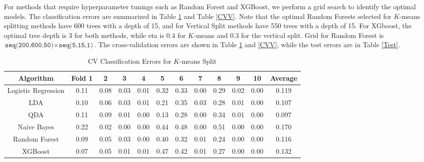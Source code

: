 \documentclass[11pt]{article}
\theoremstyle{definition}
\begin{document}
For methods that require hyperparameter tunings such as Random Forest and XGBoost, we perform a grid search to identify the optimal models. The classification errors are summarized in Table \ref{CVK} and Table \ref{CVV}. Note that the optimal Random Forests selected for $K$-means splitting methods have 600 trees with a depth of 15, and for Vertical Split methods have 550 trees with a depth of 15. For XGboost, the optimal tree depth is 3 for both methods, while eta is 0.4 for $K$-means and 0.3 for the vertical split. Grid for Random Forest is $\texttt{seq(200,600,50)}\times\texttt{seq(5,15,1)}$.  The cross-validation errors are shown in Table \ref{CVK} and \ref{CVV}, while the test errors are in Table \ref{Test}.

\begin{table}[h]
    \centering
    \begin{tabular}{c||c|c|c|c|c|c|c|c|c|c|c}
    Algorithm & Fold 1 & 2 & 3 & 4 & 5 & 6 & 7 & 8 & 9 & 10 & Average \\
    \hline
    \hline
    Logistic Regression & 0.11 & 0.08 & 0.03 & 0.01 & 0.32 & 0.33 & 0.00 & 0.29 & 0.02 & 0.00 & 0.119 \\
    \hline
    LDA & 0.10 & 0.06 & 0.03 & 0.01 & 0.21 & 0.35 & 0.03 & 0.28 & 0.01 & 0.00 & 0.107 \\
    \hline
    QDA & 0.11 & 0.09 & 0.01 & 0.00 & 0.13 & 0.28 & 0.00 & 0.34 & 0.01 & 0.00 & 0.097 \\
    \hline
    Naive Bayes & 0.22 & 0.02 & 0.00 & 0.00 & 0.44 & 0.48 & 0.00 & 0.51 & 0.00 & 0.00 & 0.170 \\
    \hline
    Random Forest & 0.09 & 0.05 & 0.03 & 0.00 & 0.40 & 0.32 & 0.01 & 0.24 & 0.00 & 0.00 & 0.116 \\
    \hline
    XGBoost & 0.07 & 0.05 & 0.01 & 0.01 & 0.47 & 0.42 & 0.01 & 0.27 & 0.00 & 0.00 & 0.132

    \end{tabular}
    \caption{CV Classification Errors for $K$-means Split}
    \label{CVK}
\end{table}
\FloatBarrier
\end{document}
